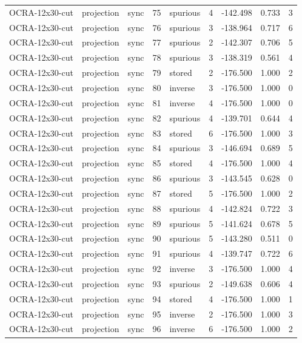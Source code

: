 \begin{tabular}{lllrlrrrr}
OCRA-12x30-cut & projection & sync & 75 & spurious & 4 & -142.498 & 0.733 & 3 \\
OCRA-12x30-cut & projection & sync & 76 & spurious & 3 & -138.964 & 0.717 & 6 \\
OCRA-12x30-cut & projection & sync & 77 & spurious & 2 & -142.307 & 0.706 & 5 \\
OCRA-12x30-cut & projection & sync & 78 & spurious & 3 & -138.319 & 0.561 & 4 \\
OCRA-12x30-cut & projection & sync & 79 & stored & 2 & -176.500 & 1.000 & 2 \\
OCRA-12x30-cut & projection & sync & 80 & inverse & 3 & -176.500 & 1.000 & 0 \\
OCRA-12x30-cut & projection & sync & 81 & inverse & 4 & -176.500 & 1.000 & 0 \\
OCRA-12x30-cut & projection & sync & 82 & spurious & 4 & -139.701 & 0.644 & 4 \\
OCRA-12x30-cut & projection & sync & 83 & stored & 6 & -176.500 & 1.000 & 3 \\
OCRA-12x30-cut & projection & sync & 84 & spurious & 3 & -146.694 & 0.689 & 5 \\
OCRA-12x30-cut & projection & sync & 85 & stored & 4 & -176.500 & 1.000 & 4 \\
OCRA-12x30-cut & projection & sync & 86 & spurious & 3 & -143.545 & 0.628 & 0 \\
OCRA-12x30-cut & projection & sync & 87 & stored & 5 & -176.500 & 1.000 & 2 \\
OCRA-12x30-cut & projection & sync & 88 & spurious & 4 & -142.824 & 0.722 & 3 \\
OCRA-12x30-cut & projection & sync & 89 & spurious & 5 & -141.624 & 0.678 & 5 \\
OCRA-12x30-cut & projection & sync & 90 & spurious & 5 & -143.280 & 0.511 & 0 \\
OCRA-12x30-cut & projection & sync & 91 & spurious & 4 & -139.747 & 0.722 & 6 \\
OCRA-12x30-cut & projection & sync & 92 & inverse & 3 & -176.500 & 1.000 & 4 \\
OCRA-12x30-cut & projection & sync & 93 & spurious & 2 & -149.638 & 0.606 & 4 \\
OCRA-12x30-cut & projection & sync & 94 & stored & 4 & -176.500 & 1.000 & 1 \\
OCRA-12x30-cut & projection & sync & 95 & inverse & 2 & -176.500 & 1.000 & 3 \\
OCRA-12x30-cut & projection & sync & 96 & inverse & 6 & -176.500 & 1.000 & 2 \\

\end{tabular}
